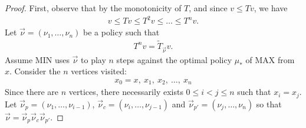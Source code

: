 \documentclass{article}
\begin{document}
\begin{proof}
  First, observe that by the monotonicity of $T$, and since $v \le Tv$, we have
  \begin{align}
    v \le Tv \le T^2 v \le \dots \le T^n v.
  \end{align}
  Let $\vec\nu=(\nu_1,\dots,\nu_n)$ be a policy such that
  \begin{align}
    T^n v = \tilde T_{\vec\nu} v.
  \end{align}
  Assume MIN uses $\vec\nu$ to play $n$ steps against the optimal policy $\mu_*$ of MAX from $x$. Consider the $n$ vertices visited:
  \begin{align}
    x_0=x,~ x_1,~ x_2,~ \dots,~ x_n
  \end{align}
  Since there are  $n$ vertices, there necessarily exists $0 \le i < j \le n$ such that $x_i=x_j$. Let $\vec\nu_p=(\nu_1,\dots,\nu_{i-1})$, $\vec\nu_c=(\nu_i,\dots,\nu_{j-1})$ and $\vec\nu_{p'}=(\nu_j,\dots,\nu_n)$ so that $\vec\nu=\vec\nu_p \vec\nu_c \vec\nu_{p'}$.
  

\end{proof}
\end{document}
